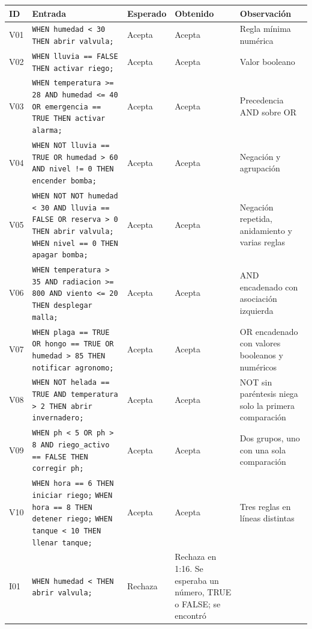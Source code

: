 \documentclass[11pt,a4paper]{article}
\begin{document}
\begingroup
\footnotesize
\begin{xltabular}{\textwidth}{l Y{1.0} l Y{1.3} Y{0.7}}
  \toprule
  \textbf{ID} & \textbf{Entrada} & \textbf{Esperado} &
  \textbf{Obtenido} & \textbf{Observación} \\
  \midrule
  \endhead
  V01 & \texttt{WHEN humedad < 30 THEN abrir valvula;} & Acepta &
  Acepta & Regla mínima numérica \\
  V02 & \texttt{WHEN lluvia == FALSE THEN activar riego;} & Acepta &
  Acepta & Valor booleano \\
  V03 & \texttt{WHEN temperatura >= 28 AND humedad <= 40 OR
  emergencia == TRUE THEN activar alarma;} & Acepta & Acepta &
  Precedencia AND sobre OR \\
  V04 & \texttt{WHEN NOT lluvia == TRUE OR humedad >
    60 AND nivel
  != 0 THEN encender bomba;} & Acepta & Acepta & Negación y agrupación \\
  V05 & \texttt{WHEN NOT NOT humedad < 30 AND
    lluvia == FALSE OR
    reserva > 0 THEN abrir valvula; WHEN nivel == 0
    THEN apagar
  bomba;} & Acepta & Acepta & Negación repetida, anidamiento y
  varias reglas \\
  V06 & \texttt{WHEN temperatura > 35 AND radiacion >= 800 AND viento
  <= 20 THEN desplegar malla;} & Acepta & Acepta & AND encadenado con
  asociación izquierda \\
  V07 & \texttt{WHEN plaga == TRUE OR hongo == TRUE OR humedad > 85
  THEN notificar agronomo;} & Acepta & Acepta & OR encadenado con
  valores booleanos y numéricos \\
  V08 & \texttt{WHEN NOT helada == TRUE AND temperatura > 2 THEN
  abrir invernadero;} & Acepta & Acepta & NOT sin paréntesis niega
  solo la primera comparación \\
  V09 & \texttt{WHEN ph < 5 OR ph > 8 AND
    riego\_\allowbreak{}activo == FALSE THEN corregir
  ph;} & Acepta &
  Acepta & Dos grupos, uno con una sola comparación \\
  V10 & \texttt{WHEN hora == 6 THEN iniciar riego;}\newline
  \texttt{WHEN hora == 8 THEN detener riego;}\newline
  \texttt{WHEN tanque < 10 THEN llenar tanque;} &
  Acepta & Acepta & Tres reglas en líneas distintas \\
  I01 & \texttt{WHEN humedad < THEN abrir valvula;} & Rechaza &
  Rechaza en 1:16. Se esperaba un número, TRUE o FALSE; se encontró

\end{xltabular}
\end{document}
